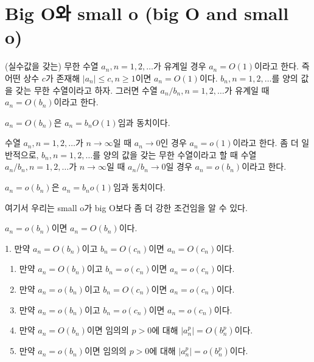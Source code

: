 \documentclass[b5paper,]{scrbook}
\theoremstyle{plain}
\theoremstyle{definition}
\numberwithin{equation}{section}
\let\BeginKnitrBlock\begin \let\EndKnitrBlock\end
\begin{document}
\section{Big O와 small o (big O and small
o)}\label{big-o-small-o-big-o-and-small-o}

\BeginKnitrBlock{definition}[big O]
\protect\hypertarget{def:unnamed-chunk-104}{}{\label{def:unnamed-chunk-104}
{} }(실수값을 갖는) 무한 수열
\(a_{n},n=1,2,\ldots\)가 유계일 경우 \(a_{n}=O(1)\)이라고 한다. 즉 어떤
상수 \(c\)가 존재해 \(|a_{n}|\leq c, n\geq 1\)이면 \(a_{n}=O(1)\)이다.
\(b_{n},n=1,2,\ldots\)를 양의 값을 갖는 무한 수열이라고 하자. 그러면
수열 \(a_{n}/b_{n}, n=1,2,\ldots\)가 유계일 때 \(a_{n}=O(b_{n})\)이라고
한다.
\EndKnitrBlock{definition}

\BeginKnitrBlock{lemma}
\protect\hypertarget{lem:unnamed-chunk-105}{}{\label{lem:unnamed-chunk-105}
}\(a_{n}=O(b_{n})\)은 \(a_{n}=b_{n}O(1)\)임과 동치이다.
\EndKnitrBlock{lemma}

\BeginKnitrBlock{definition}[small o]
\protect\hypertarget{def:unnamed-chunk-106}{}{\label{def:unnamed-chunk-106}
{} }수열 \(a_{n},n=1,2,\ldots\)가
\(n\rightarrow\infty\)일 때 \(a_{n}\rightarrow 0\)인 경우
\(a_{n}=o(1)\)이라고 한다. 좀 더 일반적으로, \(b_{n},n=1,2,\ldots\)를
양의 값을 갖는 무한 수열이라고 할 때 수열
\(a_{n}/b_{n}, n=1,2,\ldots\)가 \(n\rightarrow \infty\)일 때
\(a_{n}/b_{n}\rightarrow 0\)일 경우 \(a_{n}=o(b_{n})\)이라고 한다.
\EndKnitrBlock{definition}

\BeginKnitrBlock{lemma}
\protect\hypertarget{lem:unnamed-chunk-107}{}{\label{lem:unnamed-chunk-107}
}\(a_{n}=o(b_{n})\)은 \(a_{n}=b_{n}o(1)\)임과 동치이다.
\EndKnitrBlock{lemma}

여기서 우리는 small o가 big O보다 좀 더 강한 조건임을 알 수 있다.

\BeginKnitrBlock{lemma}
\protect\hypertarget{lem:unnamed-chunk-108}{}{\label{lem:unnamed-chunk-108}
}\(a_{n}=o(b_{n})\)이면 \(a_{n}=O(b_{n})\)이다.
\EndKnitrBlock{lemma}

\BeginKnitrBlock{lemma}[big O와 small o의 성질들]
\protect\hypertarget{lem:unnamed-chunk-109}{}{\label{lem:unnamed-chunk-109}
{} } 1. 만약
\(a_{n}=O(b_{n})\)이고 \(b_{n}=O(c_{n})\)이면 \(a_{n}=O(c_{n})\)이다.

\begin{enumerate}
\def\labelenumi{\arabic{enumi}.}
\setcounter{enumi}{1}
\item
  만약 \(a_{n}=O(b_{n})\)이고 \(b_{n}=o(c_{n})\)이면
  \(a_{n}=o(c_{n})\)이다.
\item
  만약 \(a_{n}=o(b_{n})\)이고 \(b_{n}=O(c_{n})\)이면
  \(a_{n}=o(c_{n})\)이다.
\item
  만약 \(a_{n}=o(b_{n})\)이고 \(b_{n}=o(c_{n})\)이면
  \(a_{n}=o(c_{n})\)이다.
\item
  만약 \(a_{n}=O(b_{n})\)이면 임의의 \(p>0\)에 대해
  \(|a_{n}^{p}|=O(b_{n}^{p})\)이다.
\item
  만약 \(a_{n}=o(b_{n})\)이면 임의의 \(p>0\)에 대해
  \(|a_{n}^{p}|=o(b_{n}^{p})\)이다.
\end{enumerate}
\EndKnitrBlock{lemma}
\end{document}
